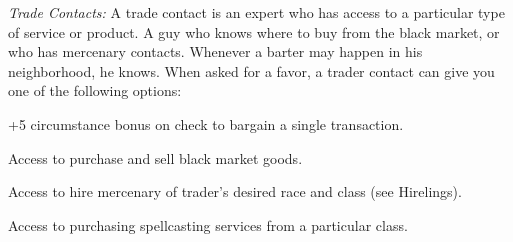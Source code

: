 \textit{Trade Contacts:} A trade contact is an expert who has access to a particular type of service or product. A guy who knows where to buy from the black market, or who has mercenary contacts. Whenever a barter may happen in his neighborhood, he knows. When asked for a favor, a trader contact can give you one of the following options:

\begin{itemize*}
\item +5 circumstance bonus on  check to bargain a single transaction.
\item Access to purchase and sell black market goods.
\item Access to hire mercenary of trader's desired race and class (see Hirelings).
\item Access to purchasing spellcasting services from a particular class.
\end{itemize*}